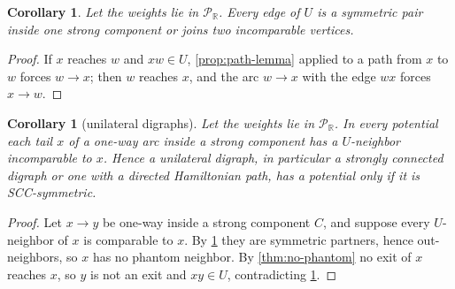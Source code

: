 \documentclass[11pt]{amsart}
\theoremstyle{plain}
\newtheorem{corollary}[theorem]{Corollary}
\theoremstyle{definition}
\theoremstyle{remark}
\numberwithin{equation}{section}
\newcommand{\RR}{\mathbb{R}}
\newcommand{\Puis}{\mathcal{P}_{\RR}}
\begin{document}
\begin{corollary}\label{cor:u-edges}
Let the weights lie in $\Puis$. Every edge of $U$ is a symmetric pair inside one strong component or joins two incomparable vertices.
\end{corollary}
\begin{proof}
If $x$ reaches $w$ and $xw\in U$, \cref{prop:path-lemma} applied to a path from $x$ to $w$ forces $w\to x$; then $w$ reaches $x$, and the arc $w\to x$ with the edge $wx$ forces $x\to w$.
\end{proof}

\begin{corollary}[unilateral digraphs]\label{cor:unilateral}
Let the weights lie in $\Puis$. In every potential each tail $x$ of a one-way arc inside a strong component has a $U$-neighbor incomparable to $x$. Hence a unilateral digraph, in particular a strongly connected digraph or one with a directed Hamiltonian path, has a potential only if it is SCC-symmetric.
\end{corollary}
\begin{proof}
Let $x\to y$ be one-way inside a strong component $C$, and suppose every $U$-neighbor of $x$ is comparable to $x$. By \cref{cor:u-edges} they are symmetric partners, hence out-neighbors, so $x$ has no phantom neighbor. By \cref{thm:no-phantom} no exit of $x$ reaches $x$, so $y$ is not an exit and $xy\in U$, contradicting \cref{cor:u-edges}.
\end{proof}
\end{document}
